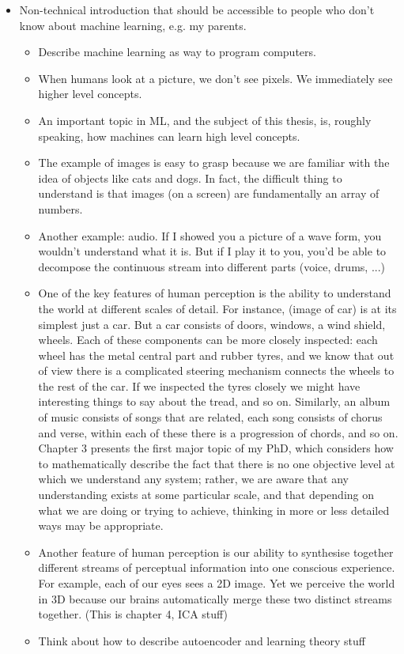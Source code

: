 \begin{itemize}
  \item Non-technical introduction that should be accessible to people who don't know about machine learning, e.g. my parents.
  \begin{itemize}
  \item Describe machine learning as way to program computers.
  \item When humans look at a picture, we don't see pixels. We immediately see higher level concepts.
  \item An important topic in ML, and the subject of this thesis, is, roughly speaking, how machines can learn high level concepts. 
  \item The example of images is easy to grasp because we are familiar with the idea of objects like cats and dogs. In fact, the difficult thing to understand is that images (on a screen) are fundamentally an array of numbers. 
  \item Another example: audio. If I showed you a picture of a wave form, you wouldn't understand what it is. But if I play it to you, you'd be able to decompose the continuous stream into different parts (voice, drums, ...)
  \item One of the key features of human perception is the ability to understand the world at different scales of detail. For instance, (image of car) is at its simplest just a car. But a car consists of doors, windows, a wind shield, wheels. Each of these components can be more closely inspected: each wheel has the metal central part and rubber tyres, and we know that out of view there is a complicated steering mechanism connects the wheels to the rest of the car. If we inspected the tyres closely we might have interesting things to say about the tread, and so on. Similarly, an album of music consists of songs that are related, each song consists of chorus and verse, within each of these there is a progression of chords, and so on. Chapter 3 presents the first major topic of my PhD, which considers how to mathematically describe the fact that there is no one objective level at which we understand any system; rather, we are aware that any understanding exists at some particular scale, and that depending on what we are doing or trying to achieve, thinking in more or less detailed ways may be appropriate.
  \item Another feature of human perception is our ability to synthesise together different streams of perceptual information into one conscious experience. For example, each of our eyes sees a 2D image. Yet we perceive the world in 3D because our brains automatically merge these two distinct streams together. (This is chapter 4, ICA stuff)
  \item Think about how to describe autoencoder and learning theory stuff
  \end{itemize}
\end{itemize}

